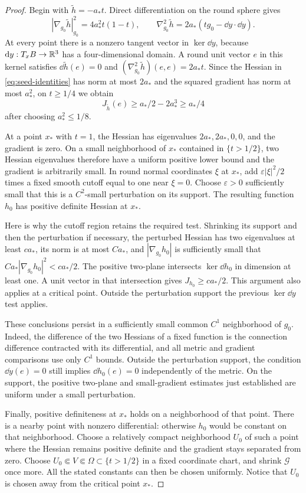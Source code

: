 \begin{proof}
Begin with $\widetilde h=-a_*t$.  Direct differentiation on the round
sphere gives
\begin{equation}\label{eq:seed-identities}
 |\nabla_{g_0}\widetilde h|_{g_0}^2
 =4a_*^2t(1-t),\qquad
 \nabla_{g_0}^2\widetilde h
 =2a_*(tg_0-\dd y\cdot\dd y).
\end{equation}
At every point there is a nonzero tangent vector in $\ker\dd y$,
because $\mathrm d y:T_xB\to\mathbb R^3$ has a four-dimensional domain.  A round
unit vector $e$ in this kernel satisfies $\dd\widetilde h(e)=0$ and
$(\nabla_{g_0}^2\widetilde h)(e,e)=2a_*t$.  Since the Hessian in
\eqref{eq:seed-identities} has norm at most $2a_*$ and the squared
gradient has norm at most $a_*^2$, on $t\ge1/4$ we obtain
\[
 J_{\widetilde h}(e)\ge a_*/2-2a_*^3\ge a_*/4
\]
after choosing $a_*^2\le1/8$.

At a point $x_*$ with $t=1$, the Hessian has eigenvalues
$2a_*,2a_*,0,0$, and the gradient is zero.  On a small neighborhood
of $x_*$ contained in $\{t>1/2\}$, two Hessian eigenvalues therefore
have a uniform positive lower bound and the gradient is arbitrarily
small.  In round normal coordinates $\xi$ at $x_*$, add
$\varepsilon|\xi|^2/2$ times a fixed smooth cutoff equal to one near
$\xi=0$.  Choose $\varepsilon>0$ sufficiently small that this is a
$C^2$-small perturbation on its support.  The resulting function $h_0$
has positive definite Hessian at $x_*$.

Here is why the cutoff region retains the required test.  Shrinking its
support and then the perturbation if necessary, the perturbed Hessian
has two eigenvalues at least $c a_*$, its norm is at most $C a_*$,
and $|\nabla_{g_0}h_0|$ is sufficiently small that
$C a_*|\nabla_{g_0}h_0|^2<c a_*/2$.  The positive two-plane
intersects $\ker\dd h_0$ in dimension at least one.  A unit vector
in that intersection gives $J_{h_0}\ge c a_*/2$.  This argument also
applies at a critical point.  Outside the perturbation support the
previous $\ker\dd y$ test applies.

These conclusions persist in a sufficiently small common $C^1$
neighborhood of $g_0$.  Indeed, the difference of the two Hessians of
a fixed function is the connection difference contracted with its
differential, and all metric and gradient comparisons use only
$C^1$ bounds.  Outside the perturbation support, the condition
$\dd y(e)=0$ still implies $\dd h_0(e)=0$ independently of the
metric.  On the support, the positive two-plane and small-gradient
estimates just established are uniform under a small perturbation.

Finally, positive definiteness at $x_*$ holds on a neighborhood of that
point.  There is a nearby point with nonzero differential: otherwise
$h_0$ would be constant on that neighborhood.  Choose a relatively
compact neighborhood $U_0$ of such a point where the Hessian remains
positive definite and the gradient stays separated from zero.  Choose
$U_0\Subset V\Subset\Omega\subset\{t>1/2\}$ in a fixed
coordinate chart, and shrink $\mathcal G$ once more.  All the stated
constants can then be chosen uniformly.  Notice that $U_0$ is chosen
away from the critical point $x_*$.
\end{proof}

